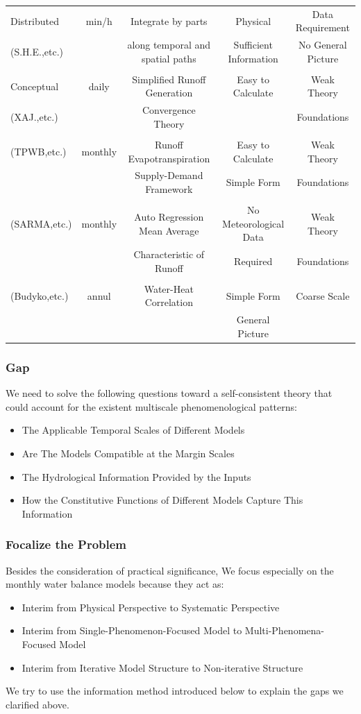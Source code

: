 \documentclass{beamer}
\begin{document}
\begin{CJK}{UTF8}{gkai}
\begin{frame}
\begin{table}[H]
\begin{center}
\begin{tabular}{l cccc}
\midrule
Distributed  & min/h & Integrate by parts  & Physical &  Data Requirement\\ 
(S.H.E.,etc.) &&along temporal and spatial paths& Sufficient Information  &  No General Picture  \\
\\
Conceptual  & daily & Simplified Runoff Generation  & Easy to Calculate &  Weak Theory \\ 
(XAJ.,etc.) &&Convergence Theory&    &  Foundations \\
\\
(TPWB,etc.)&monthly& Runoff Evapotranspiration& Easy to Calculate &Weak Theory   \\
&&Supply-Demand Framework&Simple Form &Foundations\\
\\
(SARMA,etc.)&monthly& Auto Regression Mean Average& No Meteorological Data &Weak Theory   \\
&& Characteristic of Runoff & Required &Foundations\\
\\
(Budyko,etc.)&annul&Water-Heat Correlation& Simple Form &  Coarse Scale\\
 & & &General Picture&\\
\bottomrule
\end{tabular}
\end{center}
\end{table}
\end{frame}

\begin{frame}
\frametitle{Gap}
We need to solve the following questions toward a self-consistent theory that could account for the existent multiscale phenomenological patterns:
\begin{itemize}
\item The Applicable Temporal Scales of Different Models
\item Are The Models Compatible at the Margin Scales
\item The Hydrological Information Provided by the Inputs
\item How the Constitutive Functions of Different Models Capture This Information
\end{itemize}
\end{frame}

\begin{frame}
\frametitle{Focalize the Problem}
Besides the consideration of practical significance, We focus especially on the monthly water balance models because they act as:
\begin{itemize}
\item Interim from Physical Perspective to Systematic Perspective
\item Interim from Single-Phenomenon-Focused Model to Multi-Phenomena-Focused Model
\item Interim from Iterative Model Structure to Non-iterative Structure
\end{itemize}
We try to use the information method introduced below to explain the gaps we clarified above.
\end{frame}





\end{CJK}
\end{document}
